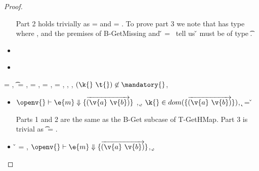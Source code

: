 \begin{lemma}
\begin{proof}
\begin{case}[T-GetHMapAbsent]
\begin{itemize}
\begin{subcase}[B-GetMissing]
         Part 2 holds trivially as \thenprop{\prop{}} = {\topprop{}}
         and \elseprop{\prop{}} = {\topprop{}}.
         To prove part 3 we note that  has type {\HMapgeneric {\mandatory{}} {\absent{}}}
         where {\inabsent{\k{}}{\absent{}}}, and
         the premises of B-GetMissing
         and
          \v{} = \nil\ 
         tell us {\v{}} must be of type {\t{}}.
      \end{subcase}
    \item[]
      \begin{subcase}[BE-Get1]
      \end{subcase}
    \item[]
      \begin{subcase}[BE-Get2]
      \end{subcase}
  \end{itemize}
\end{case}

\begin{case}[T-GetHMapPartialDefault]
  \e{} = { {}},
  \t{} = \Top,
  \thenprop{\prop{}} = {\topprop{}},
  \elseprop{\prop{}} = {\topprop{}},
  \object{} = {\replacefor
               { {\x{}}}
                          {}
                          {\x{}}},
  \judgementtwo {\propenv{}} { {}},
 \judgement {\propenv{}} { {\HMapp {\mandatory{}} {\absent}}}
           {\filterset {\thenprop {\prop{m}}} {\elseprop {\prop{m}}}}
           {\object{m}},
             ${\notinmandatory{\k{}}{\t{}}{\mandatory{}}}$,
             {\notinabsent{\k{}}{\absent{}}}

  \begin{itemize}
    \item[]
      \begin{subcase}[B-Get]
        $\opsem {\openv{}}
        {\e{m}} {\curlymap{\overrightarrow{({\v{a}}\ {\v{b}})}}}$
        ,
         \opsem {\openv{}}
                 {} {\k{}},
         $\keyinmap{\k{}}{\curlymap{\overrightarrow{({\v{a}}\ {\v{b}})}}}$,
         \getmap{\curlymap{\overrightarrow{({\v{a}}\ {\v{b}})}}} {\k{}} = {\v{}}

         Parts 1 and 2 are the same as the B-Get subcase of T-GetHMap.
         Part 3 is trivial as \t{} = \Top.


      \end{subcase}
    \item[]
      \begin{subcase}[B-GetMissing]
        \v{} = \nil,
        $\opsem {\openv{}}
        {\e{m}} {\curlymap{\overrightarrow{({\v{a}}\ {\v{b}})}}}$,
       \opsem {\openv{}} {\e{k}} {\k{}},


\end{subcase}
\end{itemize}
\end{case}
\end{proof}
\end{lemma}
